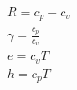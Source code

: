 \documentclass[10pt]{article} %
\begin{document}
\color{fgC}\[\begin{matrix}
R = c_p - c_v \\
\gamma = \frac{c_p}{c_v}\\
e = c_v T \\
h = c_p T
\end{matrix}\]
\end{document}
